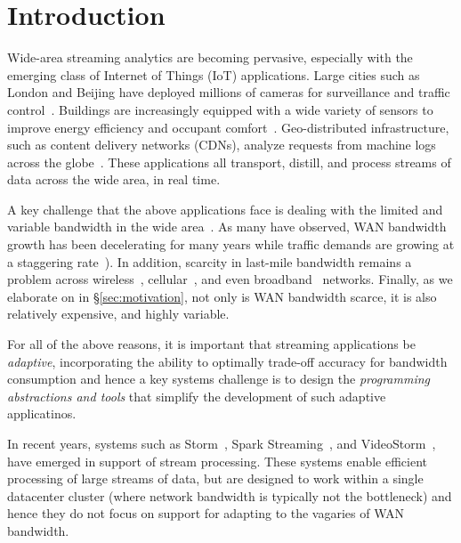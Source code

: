 \section{Introduction}

Wide-area streaming analytics are becoming pervasive, especially with the
emerging class of Internet of Things (IoT) applications.  Large cities such as
London and Beijing have deployed millions of cameras for surveillance and
traffic control~\cite{skynet, london.surveillance}. Buildings are increasingly
equipped with a wide variety of sensors to improve energy efficiency and
occupant comfort~\cite{krioukov2012building}. Geo-distributed infrastructure,
such as content delivery networks (CDNs), analyze requests from machine logs
across the globe~\cite{mukerjee2015practical}. These applications all  
transport, distill, and process streams of data across the wide area, in real
time.

A key challenge that the above applications face is dealing with the 
limited and variable bandwidth in the wide area~\cite{hsieh17gaia, vulimiri2015global}. 
As many have observed, WAN bandwidth growth has been decelerating for many 
years while traffic demands are growing at a staggering rate~\cite{global2016telegeography, index2013zettabyte,need-more,still-more}). 
In addition, scarcity in last-mile bandwidth remains a problem across wireless~\cite{}, cellular~\cite{}, 
and even broadband~\cite{} networks. 
Finally, as we elaborate on in \S\ref{sec:motivation}, not only is WAN bandwidth scarce, 
it is also relatively expensive, and highly variable.

For all of the above reasons, it is important that streaming applications be \emph{adaptive}, incorporating the ability to optimally trade-off accuracy for bandwidth consumption and hence a key systems challenge is to design the \emph{programming abstractions and tools} that simplify the development of such adaptive applicatinos. 

In recent years, systems such as Storm~\cite{toshniwal2014storm}, 
 Spark Streaming~\cite{zaharia2013discretized}, and VideoStorm~\cite{zhang2017live}, have 
emerged in support of stream processing.  These systems enable efficient processing of 
large streams of data, but are designed to work within a single datacenter cluster (where 
network bandwidth is typically not the bottleneck) and hence they do not focus on support 
for adapting to the vagaries of WAN bandwidth. 



